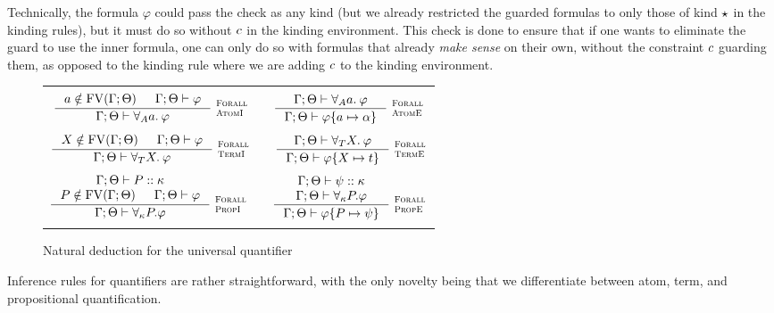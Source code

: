 \documentclass[english, mgr]{iithesis}
\renewcommand{\it}[1]{\textit{#1}}
\newcommand{\scbrk}[2]{\myatop{\textsc{#1}}{\textsc{#2}}}
\begin{document}
Technically, the formula $\varphi$ could pass the check as any kind
(but we already restricted the guarded formulas to only those of kind $\star$ in the kinding rules),
but it must do so without $c$ in the kinding environment.
This check is done to ensure that if one wants to eliminate the guard to use the inner formula,
one can only do so with formulas that already \it{make sense} on their own,
without the constraint $c$ guarding them, as opposed to the kinding rule
where we are adding $c$ to the kinding environment.

\begin{figure}[htbp]
  \centering
  \begin{tabularx}{\textwidth}{|C|}
  \hline \\ $
  \inference{
    \atomv \notin \fv[\cEnv;\Theta] &
    \jgmnt[\cEnv;\Theta]{\formphi}
  }{
    \jgmnt[\cEnv;\Theta]{\fForallAtom{\atomv}\formphi}
  }\:\scbrk{Forall}{AtomI}
  \qquad
  \inference{
    \jgmnt[\cEnv;\Theta]{\fForallAtom{\atomv}\formphi}
  }{
    \jgmnt[\cEnv;\Theta]{\formphi \{\atomv \mapsto \atomexp\}}
  }\:\scbrk{Forall}{AtomE}
  $ \\ \\ $
  \inference{
    \termv \notin \fv[\cEnv;\Theta] &
    \jgmnt[\cEnv;\Theta]{\formphi}
  }{
    \jgmnt[\cEnv;\Theta]{\fForallTerm{\termv}\formphi}
  }\:\scbrk{Forall}{TermI}
  \qquad
  \inference{
    \jgmnt[\cEnv;\Theta]{\fForallTerm{\termv}\formphi}
  }{
    \jgmnt[\cEnv;\Theta]{\formphi \{\termv \mapsto \term\}}
  }\:\scbrk{Forall}{TermE}
  $ \\ \\ $
  \inference{
    \jgmnt[\cEnv;\Theta]{\propv \ofkind \kind}
    \\
    \propv \notin \fv[\cEnv;\Theta] &
    \jgmnt[\cEnv;\Theta]{\formphi}
  }{
    \jgmnt[\cEnv;\Theta]{\fForallProp{\propv}{\kind}\formphi}
  }\:\scbrk{Forall}{PropI}
  \qquad
  \inference{
    \jgmnt[\cEnv;\Theta]{\psi \ofkind \kind}
    \\
    \jgmnt[\cEnv;\Theta]{\fForallProp{\propv}{\kind}\formphi}
  }{
    \jgmnt[\cEnv;\Theta]{\formphi \{\propv \mapsto \psi\}}
  }\:\scbrk{Forall}{PropE}
  $ \\ \\ \hline
  \end{tabularx}
  \caption{Natural deduction for the universal quantifier}
  \label{fig:quantifiers}
\end{figure}
Inference rules for quantifiers are rather straightforward, with the only novelty
being that we differentiate between atom, term, and propositional quantification.
\end{document}
